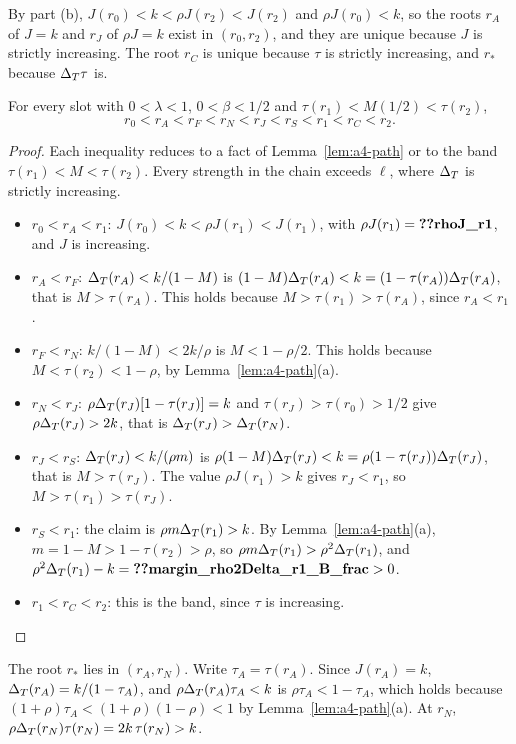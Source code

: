 By part (b), \(J(r_0)<k<\rho J(r_2)<J(r_2)\) and \(\rho J(r_0)<k\), so the roots \(r_A\) of \(J=k\) and \(r_J\) of
\(\rho J=k\) exist in \((r_0,r_2)\), and they are unique because \(J\) is strictly increasing. The root \(r_C\) is unique
because \(\tau\) is strictly increasing, and \(r_*\) because \(\Delta_T\tau\) is.

\begin{lemma}\label{lem:a4-order}
For every slot with \(0<\lambda<1\), \(0<\beta<1/2\) and \(\tau(r_1)<M(1/2)<\tau(r_2)\),
\[
r_0<r_A<r_F<r_N<r_J<r_S<r_1<r_C<r_2 .
\]
\end{lemma}

\begin{proof}
Each inequality reduces to a fact of Lemma~\ref{lem:a4-path} or to the band \(\tau(r_1)<M<\tau(r_2)\). Every strength
in the chain exceeds \(\ell\), where \(\Delta_T\) is strictly increasing.
\begin{itemize}[leftmargin=2em]
\item \(r_0<r_A<r_1\): \(J(r_0)<k<\rho J(r_1)<J(r_1)\), with \(\rho J(r_1)=\reg{rhoJ_r1}\), and \(J\) is increasing.
\item \(r_A<r_F\): \(\Delta_T(r_A)<k/(1-M)\) is \((1-M)\Delta_T(r_A)<k=(1-\tau(r_A))\Delta_T(r_A)\), that is \(M>\tau(r_A)\). This holds
because \(M>\tau(r_1)>\tau(r_A)\), since \(r_A<r_1\).
\item \(r_F<r_N\): \(k/(1-M)<2k/\rho\) is \(M<1-\rho/2\). This holds because \(M<\tau(r_2)<1-\rho\), by
Lemma~\ref{lem:a4-path}(a).
\item \(r_N<r_J\): \(\rho\Delta_T(r_J)[1-\tau(r_J)]=k\) and \(\tau(r_J)>\tau(r_0)>1/2\) give \(\rho\Delta_T(r_J)>2k\), that is
\(\Delta_T(r_J)>\Delta_T(r_N)\).
\item \(r_J<r_S\): \(\Delta_T(r_J)<k/(\rho m)\) is \(\rho(1-M)\Delta_T(r_J)<k=\rho(1-\tau(r_J))\Delta_T(r_J)\), that is \(M>\tau(r_J)\). The
value \(\rho J(r_1)>k\) gives \(r_J<r_1\), so \(M>\tau(r_1)>\tau(r_J)\).
\item \(r_S<r_1\): the claim is \(\rho m\Delta_T(r_1)>k\). By Lemma~\ref{lem:a4-path}(a), \(m=1-M>1-\tau(r_2)>\rho\), so
\(\rho m\Delta_T(r_1)>\rho^2\Delta_T(r_1)\), and \(\rho^2\DT(r_1)-k=\reg{margin_rho2Delta_r1_B_frac}>0\).
\item \(r_1<r_C<r_2\): this is the band, since \(\tau\) is increasing.\qedhere
\end{itemize}
\end{proof}

The root \(r_*\) lies in \((r_A,r_N)\). Write \(\tau_A=\tau(r_A)\). Since \(J(r_A)=k\), \(\Delta_T(r_A)=k/(1-\tau_A)\), and
\(\rho\Delta_T(r_A)\tau_A<k\) is \(\rho\tau_A<1-\tau_A\), which holds because \((1+\rho)\tau_A<(1+\rho)(1-\rho)<1\) by
Lemma~\ref{lem:a4-path}(a). At \(r_N\), \(\rho\Delta_T(r_N)\tau(r_N)=2k\,\tau(r_N)>k\).

